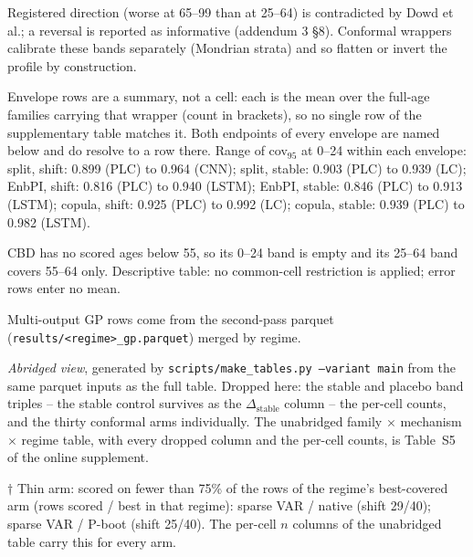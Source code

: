 \begin{table}[tbp]
\begin{threeparttable}
\begin{tablenotes}
\item Registered direction (worse at 65--99 than at 25--64) is contradicted by Dowd et al.; a reversal is reported as informative (addendum 3 \S8). Conformal wrappers calibrate these bands separately (Mondrian strata) and so flatten or invert the profile by construction.
\item Envelope rows are a summary, not a cell: each is the mean over the full-age families carrying that wrapper (count in brackets), so no single row of the supplementary table matches it. Both endpoints of every envelope are named below and do resolve to a row there. Range of cov$_{95}$ at 0--24 within each envelope: split, shift: 0.899 (PLC) to 0.964 (CNN); split, stable: 0.903 (PLC) to 0.939 (LC); EnbPI, shift: 0.816 (PLC) to 0.940 (LSTM); EnbPI, stable: 0.846 (PLC) to 0.913 (LSTM); copula, shift: 0.925 (PLC) to 0.992 (LC); copula, stable: 0.939 (PLC) to 0.982 (LSTM).
\item CBD has no scored ages below 55, so its 0--24 band is empty and its 25--64 band covers 55--64 only. Descriptive table: no common-cell restriction is applied; error rows enter no mean.
\item Multi-output GP rows come from the second-pass parquet (\texttt{results/<regime>\_gp.parquet}) merged by regime.
\item \emph{Abridged view}, generated by \texttt{scripts/make\_tables.py --variant main} from the same parquet inputs as the full table. Dropped here: the stable and placebo band triples -- the stable control survives as the $\Delta_{\mathrm{stable}}$ column -- the per-cell counts, and the thirty conformal arms individually. The unabridged family $\times$ mechanism $\times$ regime table, with every dropped column and the per-cell counts, is Table~S5 of the online supplement.
\item $\dagger$ Thin arm: scored on fewer than 75\% of the rows of the regime's best-covered arm (rows scored / best in that regime): sparse VAR / native (shift 29/40); sparse VAR / P-boot (shift 25/40). The per-cell $n$ columns of the unabridged table carry this for every arm.
\end{tablenotes}
\end{threeparttable}
\end{table}
